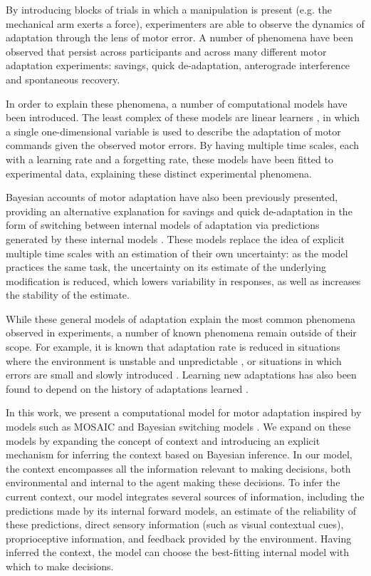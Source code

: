 \documentclass[a4paper,doc,floatsintext,natbib]{apa6}
\begin{document}
By introducing blocks of trials in which a manipulation is present (e.g. the mechanical arm exerts a force), experimenters are able to observe the dynamics of adaptation through the lens of motor error. A number of phenomena have been observed that persist across participants and across many different motor adaptation experiments: savings, quick de-adaptation, anterograde interference and spontaneous recovery.

In order to explain these phenomena, a number of computational models have been introduced. The least complex of these models are linear learners \citep[e.g.][]{Smith_Interacting_2006,Forano_Timescales_2020,Scheidt_Learning_2001}, in which a single one-dimensional variable is used to describe the adaptation of motor commands given the observed motor errors. By having multiple time scales, each with a learning rate and a forgetting rate, these models have been fitted to experimental data, explaining these distinct experimental phenomena.

Bayesian accounts of motor adaptation have also been previously presented, providing an alternative explanation for savings and quick de-adaptation in the form of switching between internal models of adaptation via predictions generated by these internal models \citep{Kording_Bayesian_2004,Oh_Minimizing_2019}. These models replace the idea of explicit multiple time scales with an estimation of their own uncertainty: as the model practices the same task, the uncertainty on its estimate of the underlying modification is reduced, which lowers variability in responses, as well as increases the stability of the estimate.

While these general models of adaptation explain the most common phenomena observed in experiments, a number of known phenomena remain outside of their scope. For example, it is known that adaptation rate is reduced in situations where the environment is unstable and unpredictable \citep{Herzfeld_memory_2014}, or situations in which errors are small \citep{Marko_Sensitivity_2012} and slowly introduced \citep{Huang_Persistence_2009}. Learning new adaptations has also been found to depend on the history of adaptations learned \citep{Vaswani_Decay_2013}.

In this work, we present a computational model for motor adaptation inspired by models such as MOSAIC \citep{Wolpert_Multiple_1998} and Bayesian switching models \citep{Kording_Bayesian_2004,Oh_Minimizing_2019}. We expand on these models by expanding the concept of context and introducing an explicit mechanism for inferring the context based on Bayesian inference. In our model, the context encompasses all the information relevant to making decisions, both environmental and internal to the agent making these decisions. To infer the current context, our model integrates several sources of information, including the predictions made by its internal forward models, an estimate of the reliability of these predictions, direct sensory information (such as visual contextual cues), proprioceptive information, and feedback provided by the environment. Having inferred the context, the model can choose the best-fitting internal model with which to make decisions.
\end{document}
